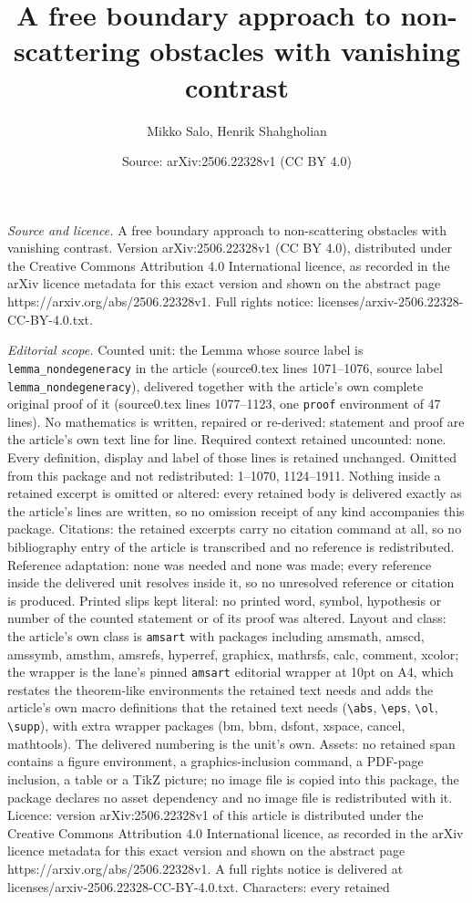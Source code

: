 \documentclass[10pt,a4paper]{amsart}
\title[A free boundary approach to non-scattering obstacles with va]{A free boundary approach to non-scattering obstacles with vanishing contrast}
\author{Mikko Salo, Henrik Shahgholian}
\date{Source: arXiv:2506.22328v1 (CC BY 4.0)}
\begin{document}
\maketitle

\noindent\emph{Source and licence.} A free boundary approach to non-scattering obstacles with vanishing contrast. Version arXiv:2506.22328v1 (CC BY 4.0), distributed under the Creative Commons Attribution 4.0 International licence, as recorded in the arXiv licence metadata for this exact version and shown on the abstract page https://arxiv.org/abs/2506.22328v1. Full rights notice: licenses/arxiv-2506.22328-CC-BY-4.0.txt.\par\smallskip

\noindent\textit{Editorial scope.} Counted unit: the Lemma whose source label is \texttt{lemma\_nondegeneracy} in the article (source0.tex lines 1071--1076, source label \texttt{lemma\_nondegeneracy}), delivered together with the article's own complete original proof of it (source0.tex lines 1077--1123, one \texttt{proof} environment of 47 lines). No mathematics is written, repaired or re-derived: statement and proof are the article's own text line for line. Required context retained uncounted: none. Every definition, display and label of those lines is retained unchanged. Omitted from this package and not redistributed: 1--1070, 1124--1911. Nothing inside a retained excerpt is omitted or altered: every retained body is delivered exactly as the article's lines are written, so no omission receipt of any kind accompanies this package. Citations: the retained excerpts carry no citation command at all, so no bibliography entry of the article is transcribed and no reference is redistributed. Reference adaptation: none was needed and none was made; every reference inside the delivered unit resolves inside it, so no unresolved reference or citation is produced. Printed slips kept literal: no printed word, symbol, hypothesis or number of the counted statement or of its proof was altered. Layout and class: the article's own class is \texttt{amsart} with packages including amsmath, amscd, amssymb, amsthm, amsrefs, hyperref, graphicx, mathrsfs, calc, comment, xcolor; the wrapper is the lane's pinned \texttt{amsart} editorial wrapper at 10pt on A4, which restates the theorem-like environments the retained text needs and adds the article's own macro definitions that the retained text needs (\texttt{\textbackslash abs}, \texttt{\textbackslash eps}, \texttt{\textbackslash ol}, \texttt{\textbackslash supp}), with extra wrapper packages (bm, bbm, dsfont, xspace, cancel, mathtools). The delivered numbering is the unit's own. Assets: no retained span contains a figure environment, a graphics-inclusion command, a PDF-page inclusion, a table or a TikZ picture; no image file is copied into this package, the package declares no asset dependency and no image file is redistributed with it. Licence: version arXiv:2506.22328v1 of this article is distributed under the Creative Commons Attribution 4.0 International licence, as recorded in the arXiv licence metadata for this exact version and shown on the abstract page https://arxiv.org/abs/2506.22328v1. A full rights notice is delivered at licenses/arxiv-2506.22328-CC-BY-4.0.txt. Characters: every retained 
\end{document}
